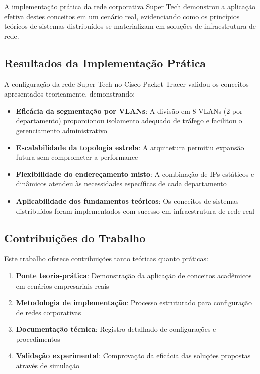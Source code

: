 A implementação prática da rede corporativa Super Tech demonstrou a aplicação efetiva destes conceitos em um cenário real, evidenciando como os princípios teóricos de sistemas distribuídos se materializam em soluções de infraestrutura de rede.

\subsection{Resultados da Implementação Prática}

A configuração da rede Super Tech no Cisco Packet Tracer validou os conceitos apresentados teoricamente, demonstrando:

\begin{itemize}
    \item \textbf{Eficácia da segmentação por VLANs}: A divisão em 8 VLANs (2 por departamento) proporcionou isolamento adequado de tráfego e facilitou o gerenciamento administrativo
    \item \textbf{Escalabilidade da topologia estrela}: A arquitetura permitiu expansão futura sem comprometer a performance
    \item \textbf{Flexibilidade do endereçamento misto}: A combinação de IPs estáticos e dinâmicos atendeu às necessidades específicas de cada departamento
    \item \textbf{Aplicabilidade dos fundamentos teóricos}: Os conceitos de sistemas distribuídos foram implementados com sucesso em infraestrutura de rede real
\end{itemize}

\subsection{Contribuições do Trabalho}

Este trabalho oferece contribuições tanto teóricas quanto práticas:

\begin{enumerate}
    \item \textbf{Ponte teoria-prática}: Demonstração da aplicação de conceitos acadêmicos em cenários empresariais reais
    \item \textbf{Metodologia de implementação}: Processo estruturado para configuração de redes corporativas
    \item \textbf{Documentação técnica}: Registro detalhado de configurações e procedimentos
    \item \textbf{Validação experimental}: Comprovação da eficácia das soluções propostas através de simulação
\end{enumerate}


